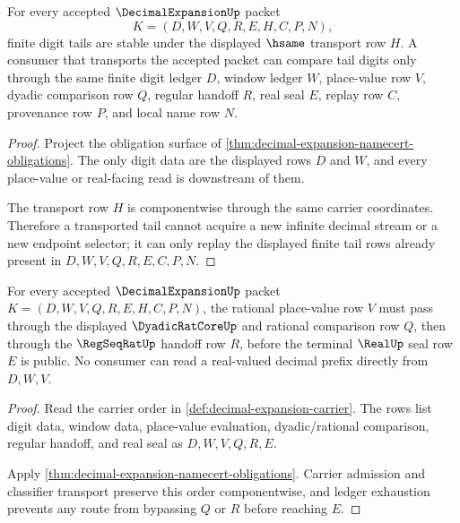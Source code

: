 \begin{theorem}
\label{thm:decimal-expansion-tail-digit-stability}
For every accepted $\DecimalExpansionUp$ packet
$$
K=(D,W,V,Q,R,E,H,C,P,N),
$$
finite digit tails are stable under the displayed $\hsame$ transport row $H$. A consumer that transports the accepted packet can compare tail digits only through the same finite digit ledger $D$, window ledger $W$, place-value row $V$, dyadic comparison row $Q$, regular handoff $R$, real seal $E$, replay row $C$, provenance row $P$, and local name row $N$.
\end{theorem}
\begin{proof}
Project the obligation surface of \autoref{thm:decimal-expansion-namecert-obligations}. The only digit data are the displayed rows $D$ and $W$, and every place-value or real-facing read is downstream of them.

The transport row $H$ is componentwise through the same carrier coordinates. Therefore a transported tail cannot acquire a new infinite decimal stream or a new endpoint selector; it can only replay the displayed finite tail rows already present in $D,W,V,Q,R,E,C,P,N$.
\end{proof}

\begin{theorem}
\label{thm:decimal-expansion-rat-real-handoff}
For every accepted $\DecimalExpansionUp$ packet $K=(D,W,V,Q,R,E,H,C,P,N)$, the rational place-value row $V$ must pass through the displayed $\DyadicRatCoreUp$ and rational comparison row $Q$, then through the $\RegSeqRatUp$ handoff row $R$, before the terminal $\RealUp$ seal row $E$ is public. No consumer can read a real-valued decimal prefix directly from $D,W,V$.
\end{theorem}
\begin{proof}
Read the carrier order in \autoref{def:decimal-expansion-carrier}. The rows list digit data, window data, place-value evaluation, dyadic/rational comparison, regular handoff, and real seal as $D,W,V,Q,R,E$.

Apply \autoref{thm:decimal-expansion-namecert-obligations}. Carrier admission and classifier transport preserve this order componentwise, and ledger exhaustion prevents any route from bypassing $Q$ or $R$ before reaching $E$.
\end{proof}

